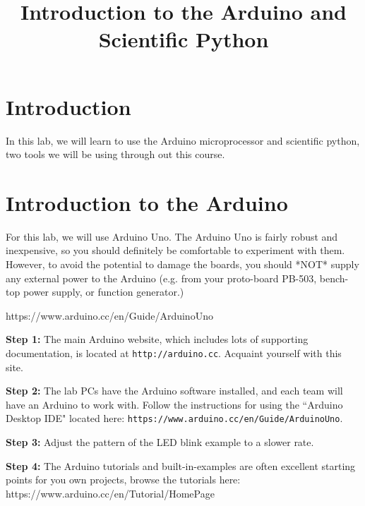 \documentclass[12pt]{article}
\begin{document}

\title{Introduction to the Arduino and Scientific Python} 

\maketitle

\section{Introduction}

In this lab, we will learn to use the Arduino microprocessor and scientific python, two tools we will be using through out this course.


\section{Introduction to the Arduino}

For this lab, we will use Arduino Uno.  The Arduino Uno is fairly robust and inexpensive, so you should definitely be comfortable to experiment with them.  However, to avoid the potential to damage the boards, you should *NOT* supply any external power to the Arduino (e.g. from your proto-board PB-503, bench-top power supply, or function generator.)  


https://www.arduino.cc/en/Guide/ArduinoUno

\vspace{0.5 cm}

\noindent
{\bf Step 1:} The main Arduino website, which includes lots of
supporting documentation, is located at {\tt http://arduino.cc}.
Acquaint yourself with this site. 
\vspace{0.5 cm}

\noindent
{\bf Step 2:} The lab PCs have the Arduino software installed, and
each team will have an Arduino to work with.  Follow the instructions
for using the ``Arduino Desktop IDE" located here:  
{\tt https://www.arduino.cc/en/Guide/ArduinoUno}.
\vspace{0.5 cm}

\noindent
{\bf Step 3:} Adjust the pattern of the LED blink example to a slower rate. 
\vspace{0.5 cm}

\noindent
{\bf Step 4:}  The Arduino tutorials and built-in-examples are often excellent starting points for you own projects, browse the tutorials here:\\
https://www.arduino.cc/en/Tutorial/HomePage
\vspace{0.5 cm}
\end{document}

